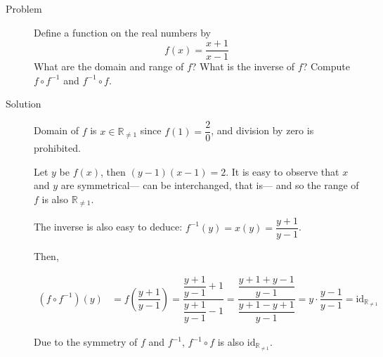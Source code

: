 \begin{description}
\item[Problem] Define a function on the real numbers by
$$f(x) = \dfrac{x + 1}{x - 1}$$
What are the domain and range of $f$? What is the inverse of $f$? Compute
$f \circ f^{-1}$ and $f^{-1} \circ f$.
\item[Solution]
Domain of $f$ is $x \in \mathbb{R}_{\ne 1}$ since $f(1) = \dfrac{2}{0}$, and
division by zero is prohibited.

Let $y$ be $f(x)$, then $(y-1)(x-1) = 2$. It is easy to observe that $x$ and
$y$ are symmetrical--- can be interchanged, that is--- and so the range of $f$
is also $\mathbb{R}_{\ne 1}$.

The inverse is also easy to deduce: $f^{-1}(y) = x(y) = \dfrac{y + 1}{y - 1}$.

Then,

\begin{equation*}
\begin{aligned}
(f \circ f^{-1})(y) &= f\left(\dfrac{y + 1}{y - 1}\right)
                     = \dfrac{\dfrac{y + 1}{y - 1} + 1}
                             {\dfrac{y + 1}{y - 1} - 1}
                     = \dfrac{\dfrac{y + 1 + y - 1}{y - 1}}
                             {\dfrac{y + 1 - y + 1}{y - 1}}
                     = y \cdot \dfrac{y-1}{y-1}
                     = \text{id}_{\mathbb{R}_{\ne 1}}
\end{aligned}
\end{equation*}

Due to the symmetry of $f$ and $f^{-1}$, $f^{-1} \circ f$ is also
$\text{id}_{\mathbb{R}_{\ne 1}}$.

\end{description}
